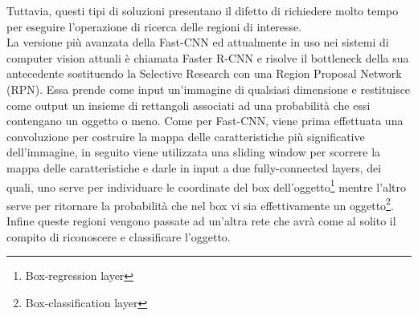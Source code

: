 Tuttavia, questi tipi di soluzioni presentano il difetto di richiedere molto tempo per eseguire l'operazione di ricerca delle regioni di interesse.\\
La versione più avanzata della Fast-CNN ed attualmente in uso nei sistemi di computer vision attuali è chiamata Faster R-CNN e risolve il bottleneck della sua antecedente sostituendo la Selective Research con una Region Proposal Network (RPN). Essa prende come input un'immagine di qualsiasi dimensione e restituisce come output un insieme di rettangoli associati ad una probabilità che essi contengano un oggetto o meno. Come per Fast-CNN, viene prima effettuata una convoluzione per costruire la mappa delle caratteristiche più significative dell'immagine, in seguito viene utilizzata una sliding window per scorrere la mappa delle caratteristiche e darle in input a due fully-connected layers, dei quali, uno serve per individuare le coordinate del box dell'oggetto\footnote{Box-regression layer} mentre l'altro serve per ritornare la probabilità che nel box vi sia effettivamente un oggetto\footnote{Box-classification layer}. Infine queste regioni vengono passate ad un'altra rete che avrà come al solito il compito di riconoscere e classificare l'oggetto.
